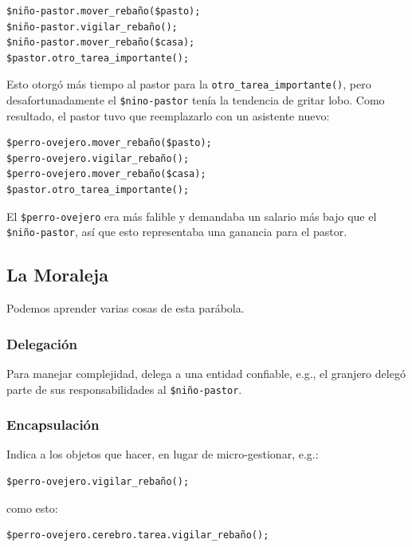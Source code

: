 \begin{lstlisting}
$niño-pastor.mover_rebaño($pasto);
$niño-pastor.vigilar_rebaño();
$niño-pastor.mover_rebaño($casa);
$pastor.otro_tarea_importante();
\end{lstlisting}

Esto otorgó más tiempo al pastor para la
\verb|otro_tarea_importante()|, pero desafortunadamente
el \verb|$nino-pastor| tenía la tendencia de gritar lobo.
Como resultado, el pastor tuvo que reemplazarlo con un 
asistente nuevo:

\begin{lstlisting}
$perro-ovejero.mover_rebaño($pasto);
$perro-ovejero.vigilar_rebaño();
$perro-ovejero.mover_rebaño($casa);
$pastor.otro_tarea_importante();
\end{lstlisting}

El \verb|$perro-ovejero| era más falible y demandaba 
un salario más bajo que el \verb|$niño-pastor|, así que
esto representaba una ganancia para el pastor.

\subsection{La Moraleja}

Podemos aprender varias cosas de esta parábola.

\subsubsection{Delegación}

Para manejar complejidad, delega a una entidad confiable, e.g.,
el granjero delegó parte de sus responsabilidades al \verb|$niño-pastor|.

\subsubsection{Encapsulación}

Indica a los objetos que hacer, en lugar de micro-gestionar, e.g.:

\begin{lstlisting}
$perro-ovejero.vigilar_rebaño();
\end{lstlisting}

como esto:

\begin{lstlisting}
$perro-ovejero.cerebro.tarea.vigilar_rebaño();
\end{lstlisting}

